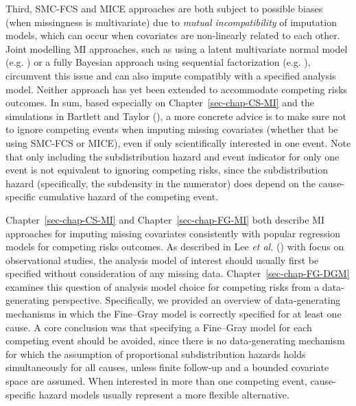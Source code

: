 \documentclass[
  letterpaper,
  DIV=11,
  numbers=noendperiod]{scrreprt}
\begin{document}
Third, SMC-FCS and MICE approaches are both subject to possible biases
(when missingness is multivariate) due to \emph{mutual incompatibility}
of imputation models, which can occur when covariates are non-linearly
related to each other. Joint modelling MI approaches, such as using a
latent multivariate normal model (e.g.
) or a fully Bayesian approach using sequential
factorization (e.g.
), circumvent this issue and can also impute compatibly with a
specified analysis model. Neither approach has yet been extended to
accommodate competing risks outcomes. In sum, based especially on
Chapter~\ref{sec-chap-CS-MI} and the simulations in Bartlett and Taylor
(), a more
concrete advice is to make sure not to ignore competing events when
imputing missing covariates (whether that be using SMC-FCS or MICE),
even if only scientifically interested in one event. Note that only
including the subdistribution hazard and event indicator for only one
event is not equivalent to ignoring competing risks, since the
subdistribution hazard (specifically, the subdensity in the numerator)
does depend on the cause-specific cumulative hazard of the competing
event.

Chapter~\ref{sec-chap-CS-MI} and Chapter~\ref{sec-chap-FG-MI} both
describe MI approaches for imputing missing covariates consistently with
popular regression models for competing risks outcomes. As described in
Lee \emph{et al.}
() with focus on
observational studies, the analysis model of interest should usually
first be specified without consideration of any missing data.
Chapter~\ref{sec-chap-FG-DGM} examines this question of analysis model
choice for competing risks from a data-generating perspective.
Specifically, we provided an overview of data-generating mechanisms in
which the Fine--Gray model is correctly specified for at least one
cause. A core conclusion was that specifying a Fine--Gray model for each
competing event should be avoided, since there is no data-generating
mechanism for which the assumption of proportional subdistribution
hazards holds simultaneously for all causes, unless finite follow-up and
a bounded covariate space are assumed. When interested in more than one
competing event, cause-specific hazard models usually represent a more
flexible alternative.
\end{document}
